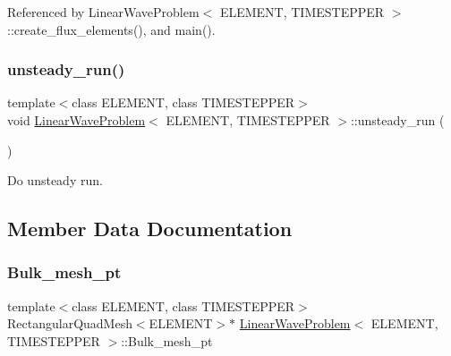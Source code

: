 Referenced by Linear\+Wave\+Problem$<$ E\+L\+E\+M\+E\+N\+T, T\+I\+M\+E\+S\+T\+E\+P\+P\+E\+R $>$\+::create\+\_\+flux\+\_\+elements(), and main().

\mbox{\label{classLinearWaveProblem_a9993365201bfffcc04dd2034f0d3d391}} 
\subsubsection{\texorpdfstring{unsteady\+\_\+run()}{unsteady\_run()}\hspace{0.1cm}{\footnotesize\ttfamily [2/2]}}
{\footnotesize\ttfamily template$<$class E\+L\+E\+M\+E\+NT, class T\+I\+M\+E\+S\+T\+E\+P\+P\+ER$>$ \\
void \hyperlink{classLinearWaveProblem}{Linear\+Wave\+Problem}$<$ E\+L\+E\+M\+E\+NT, T\+I\+M\+E\+S\+T\+E\+P\+P\+ER $>$\+::unsteady\+\_\+run (\begin{DoxyParamCaption}{ }\end{DoxyParamCaption})}



Do unsteady run. 



\subsection{Member Data Documentation}
\mbox{\label{classLinearWaveProblem_aace6aa3bcf449d57976786ef776c0f5a}} 
\subsubsection{\texorpdfstring{Bulk\+\_\+mesh\+\_\+pt}{Bulk\_mesh\_pt}}
{\footnotesize\ttfamily template$<$class E\+L\+E\+M\+E\+NT, class T\+I\+M\+E\+S\+T\+E\+P\+P\+ER$>$ \\
Rectangular\+Quad\+Mesh$<$E\+L\+E\+M\+E\+NT$>$$\ast$ \hyperlink{classLinearWaveProblem}{Linear\+Wave\+Problem}$<$ E\+L\+E\+M\+E\+NT, T\+I\+M\+E\+S\+T\+E\+P\+P\+ER $>$\+::Bulk\+\_\+mesh\+\_\+pt\hspace{0.3cm}{\ttfamily [private]}}



